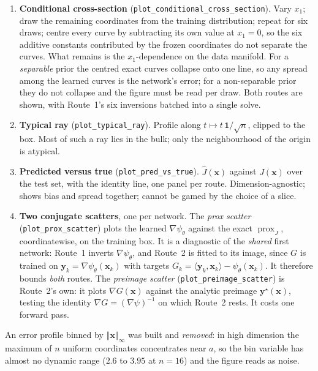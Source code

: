 \documentclass[11pt]{article}
\newcommand{\bx}{\boldsymbol{x}}
\newcommand{\by}{\boldsymbol{y}}
\newcommand{\norminf}[1]{\left\Vert #1 \right\Vert_{\infty}}
\DeclareMathOperator{\prox}{prox}
\begin{document}
\begin{enumerate}
  \item \textbf{Conditional cross-section}
        (\texttt{plot\_conditional\_cross\_section}). Vary $x_{1}$; draw the
        remaining coordinates from the training distribution; repeat for six
        draws; centre every curve by subtracting its own value at $x_{1}=0$, so
        the six additive constants contributed by the frozen coordinates do not
        separate the curves. What remains is the $x_{1}$-dependence on the data
        manifold. For a \emph{separable} prior the centred exact curves collapse
        onto one line, so any spread among the learned curves is the network's
        error; for a non-separable prior they do not collapse and the figure must
        be read per draw. Both routes are shown, with Route~1's six inversions
        batched into a single solve.
  \item \textbf{Typical ray} (\texttt{plot\_typical\_ray}). Profile along
        $t\mapsto t\,\mathbf{1}/\sqrt{n}$, clipped to the box. Most of such a ray
        lies in the bulk; only the neighbourhood of the origin is atypical.
  \item \textbf{Predicted versus true} (\texttt{plot\_pred\_vs\_true}).
        $\widehat{J}(\bx)$ against $J(\bx)$ over the test set, with the identity
        line, one panel per route. Dimension-agnostic; shows bias and spread
        together; cannot be gamed by the choice of a slice.
  \item \textbf{Two conjugate scatters}, one per network. The
        \emph{prox scatter} (\texttt{plot\_prox\_scatter}) plots the learned
        $\nabla\psi_{\theta}$ against the exact $\prox_{J}$, coordinatewise, on
        the training box. It is a diagnostic of the \emph{shared} first network:
        Route~1 inverts $\nabla\psi_{\theta}$, and Route~2 is fitted to its
        image, since $G$ is trained on $\by_{k}=\nabla\psi_{\theta}(\bx_{k})$ with
        targets $G_{k}=\langle \by_{k},\bx_{k}\rangle-\psi_{\theta}(\bx_{k})$. It
        therefore bounds \emph{both} routes. The \emph{preimage scatter}
        (\texttt{plot\_preimage\_scatter}) is Route~2's own: it plots
        $\nabla G(\bx)$ against the analytic preimage $\by^{\star}(\bx)$, testing
        the identity $\nabla G=(\nabla\psi)^{-1}$ on which Route~2 rests. It costs
        one forward pass.
\end{enumerate}

An error profile binned by $\norminf{\bx}$ was built and \emph{removed}: in high
dimension the maximum of $n$ uniform coordinates concentrates near $a$, so the
bin variable has almost no dynamic range ($2.6$ to $3.95$ at $n=16$) and the
figure reads as noise.
\end{document}
